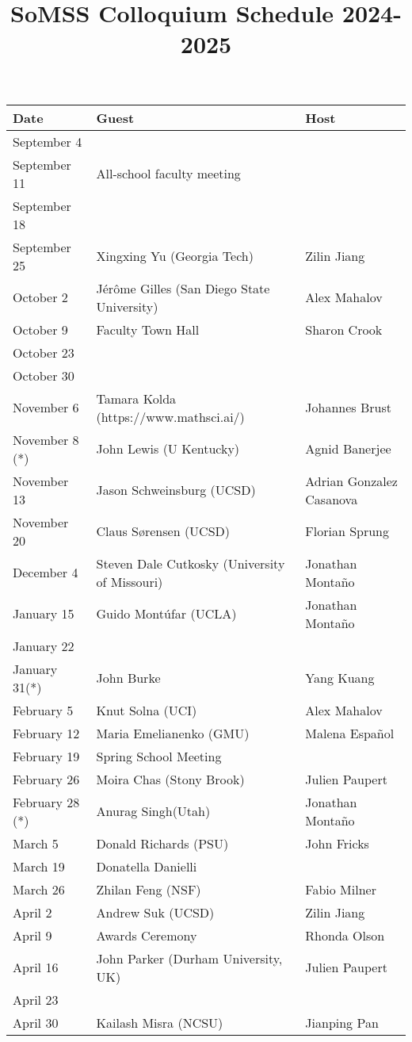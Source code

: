 \documentclass[11pt]{article}
\begin{document}
\title{SoMSS Colloquium Schedule 2024-2025}
\author{}
\date{}
\maketitle
\begin{center}
\begin{tabular}{|l|l|l|}
\hline
Date & Guest & Host\\
\hline
September 4 & & \\
September 11 & All-school faculty meeting & \\
September 18 & & \\
September 25 & Xingxing Yu (Georgia Tech) & Zilin Jiang\\
October 2 &J\'er\^ome Gilles (San Diego State University)& Alex Mahalov \\
October 9 & Faculty Town Hall & Sharon Crook\\
October 23 & & \\
October 30 & & \\
November 6 & Tamara Kolda (https://www.mathsci.ai/) & Johannes Brust\\
November 8 (*) & John Lewis (U Kentucky) & Agnid Banerjee\\
November 13 & Jason Schweinsburg (UCSD) & Adrian Gonzalez Casanova\\
November 20 &Claus S\o rensen (UCSD) & Florian Sprung \\
December 4 & Steven Dale Cutkosky (University of Missouri) & Jonathan Monta\~no \\
January 15 & Guido Mont\'ufar (UCLA) & Jonathan Monta\~no \\
January 22 & &\\
January 31(*) & John Burke& Yang Kuang \\
February 5 & Knut Solna (UCI) & Alex Mahalov\\
February 12 & Maria Emelianenko (GMU) & Malena Espa\~nol\\
February 19 & Spring School Meeting & \\
February 26  & Moira Chas (Stony Brook) & Julien Paupert \\
February 28 (*) & Anurag Singh(Utah) & Jonathan Monta\~no\\
March 5 & Donald Richards (PSU) & John Fricks \\
March 19 & Donatella Danielli& \\
March 26 &Zhilan Feng (NSF) & Fabio Milner\\
April 2 & Andrew Suk (UCSD) & Zilin Jiang\\
April 9 & Awards Ceremony & Rhonda Olson\\
April 16 & John Parker (Durham University, UK)& Julien Paupert \\
April 23 & & \\
April 30 & Kailash Misra  (NCSU) & Jianping Pan\\
\hline
\end{tabular}
\end{center}
\end{document}

